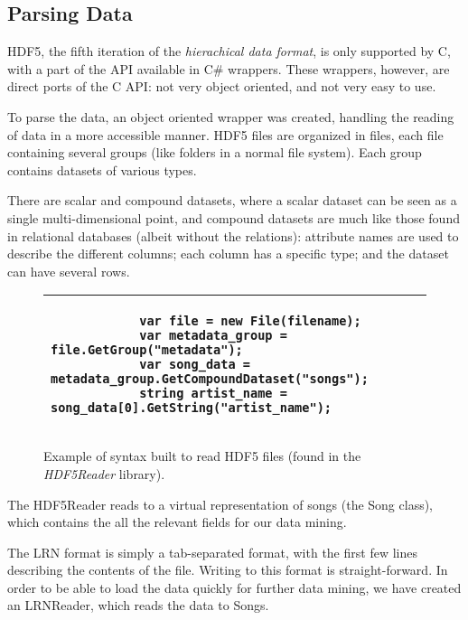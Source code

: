\subsection{Parsing Data}
\label{sec:preprocessing_parsing}

HDF5, the fifth iteration of the \emph{hierachical data format}, is only supported by C, with a part of the API available
in C\# wrappers. These wrappers, however, are direct ports of the C API: not very object oriented, and not very easy to use.

To parse the data, an object oriented wrapper was created, handling the reading of data in a more accessible manner. HDF5 files
are organized in files, each file containing several groups (like folders in a normal file system). Each group contains
datasets of various types.

There are scalar and compound datasets, where a scalar dataset can be seen as a single multi-dimensional point, and compound
datasets are much like those found in relational databases (albeit without the relations): attribute names are used to describe
the different columns; each column has a specific type; and the dataset can have several rows.

\begin{figure}[h!]
	\begin{tabular}{|p{\textwidth}|}
		\hline
		\begin{verbatim}
			var file = new File(filename);
			var metadata_group = file.GetGroup("metadata");
			var song_data = metadata_group.GetCompoundDataset("songs");
			string artist_name = song_data[0].GetString("artist_name");
		\end{verbatim} \\
		\hline
	\end{tabular}
	\caption{Example of syntax built to read HDF5 files (found in the \emph{HDF5Reader} library).}
\end{figure}

The HDF5Reader reads to a virtual representation of songs (the Song class), which contains the all the relevant fields for our data
mining.

The LRN format is simply a tab-separated format, with the first few lines describing the contents of the file. Writing to this format
is straight-forward. In order to be able to load the data quickly for further data mining, we have created an LRNReader, which reads
the data to Songs.
